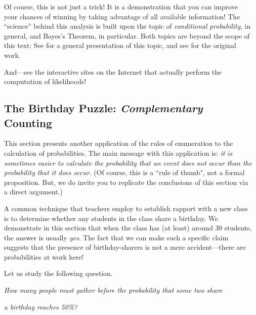  
Of course, this is not just a trick!  It is a demonstration that you can improve your chances 
of winning by taking advantage of all available information!  The ``science'' behind this 
analysis is built upon the topic of {\em conditional probability}, in general, and Bayes's 
Theorem, in particular.  Both topics are beyond the scope of this text: See \cite{Lee12} for 
a general presentation of this topic, and see \cite{Bayes} for the original work.

And---see the interactive sites on the Internet that actually perform the
computation of likelihoods!


\subsection{The Birthday Puzzle: {\em Complementary} Counting}
\label{sec:birthday-puzzle}

This section presents another application of the rules of enumeration
to the calculation of probabilities.%
The main message with this application is:
{\em it is sometimes easier to calculate the probability that an event {\em does not} occur than
the probability that it {\em does} occur.}  (Of course, this is a ``rule of thumb", not a formal 
proposition. But, we do invite you to replicate the conclusions of this section via a direct argument.)

\medskip

A common technique that teachers employ to establish rapport with a new class is to determine 
whether any students in the class share a birthday.  We demonstrate in this section that when 
the class has (at least) around 30 students, the answer is usually \textit{yes}.  The fact that we 
can make such a specific claim  suggests that the presence of birthday-sharers is not a mere 
accident---there are probabilities at work here!

\smallskip

Let us study the following question.

\smallskip

{\it How many people must gather before the probability that some two share}

{\it a birthday reaches 50\%?}

\medskip


